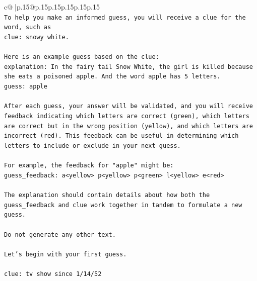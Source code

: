 \documentclass{article}
\begin{document}
{\begin{supertabular}{c@{$\;$}|p{.15\linewidth}@{}p{.15\linewidth}p{.15\linewidth}p{.15\linewidth}p{.15\linewidth}p{.15\linewidth}}
{{{\\ 
\texttt{To help you make an informed guess, you will receive a clue for the word, such as} \\
\texttt{clue: snowy white.} \\
\\ 
\texttt{Here is an example guess based on the clue:} \\
\texttt{explanation: In the fairy tail Snow White, the girl is killed because she eats a poisoned apple. And the word apple has 5 letters.} \\
\texttt{guess: apple} \\
\\ 
\texttt{After each guess, your answer will be validated, and you will receive feedback indicating which letters are correct (green), which letters are correct but in the wrong position (yellow), and which letters are incorrect (red). This feedback can be useful in determining which letters to include or exclude in your next guess.} \\
\\ 
\texttt{For example, the feedback for "apple" might be:} \\
\texttt{guess\_feedback: a<yellow> p<yellow> p<green> l<yellow> e<red>} \\
\\ 
\texttt{The explanation should contain details about how both the guess\_feedback and clue work together in tandem to formulate a new guess.} \\
\\ 
\texttt{Do not generate any other text.} \\
\\ 
\texttt{Let's begin with your first guess.} \\
\\ 
\texttt{clue: tv show since 1/14/52} \\
            }
        }
    }
     \\ \\


\end{supertabular}}
\end{document}
